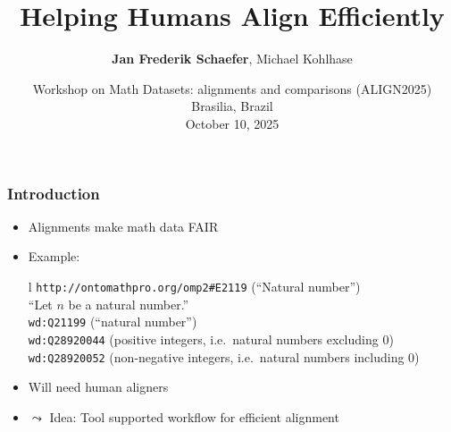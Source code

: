 \documentclass[aspectratio=169]{beamer}
\title{Helping Humans Align Efficiently}
\author{{\bf Jan Frederik Schaefer}, Michael Kohlhase}
\institute{FAU Erlangen-N\"urnberg}
\date{Workshop on Math Datasets: alignments and comparisons (ALIGN2025)\\Brasilia, Brazil\\October 10, 2025}
\def\texthl#1{\colorbox{yellow!50!red!70}{#1}}
\begin{document}
\frame\titlepage



\begin{frame}[fragile]
    \frametitle{Introduction}
    \renewcommand\arraystretch{1.2}%
    \begin{itemize}
        \item Alignments make math data FAIR 
        \item Example: %
            \begin{tabular}l
                \texttt{http://ontomathpro.org/omp2\#E2119} (``Natural number'')\\
                    \hline
                    \hline
                ``Let $n$ be a \texthl{natural number}.''\\
                    \hline
                    \hline
                    \pause
                \texttt{wd:Q21199} (``natural number'')\\
                \texttt{wd:Q28920044} (positive integers, i.e.\ natural numbers excluding 0)\\
                \texttt{wd:Q28920052} (non-negative integers, i.e.\ natural numbers including 0)\\
            \end{tabular}
            \pause
        \item Will need human aligners
        \item $\leadsto$ Idea: Tool supported workflow for efficient alignment
    \end{itemize}
\end{frame}
\end{document}
